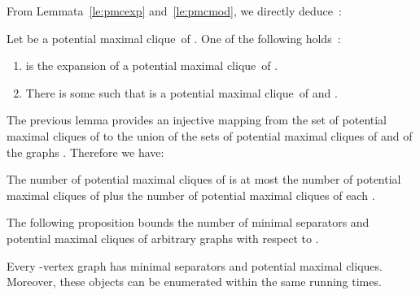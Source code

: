 \documentclass{llncs}
\newcommand{\pmc}{potential maximal clique}
\begin{document}
From Lemmata~\ref{le:pmcexp} and~\ref{le:pmcmod}, we directly deduce~:
\begin{lemma}\label{le:pmcmw}
Let  be a \pmc\ of . One of the following holds~:
\begin{enumerate}
\item  is the expansion of a \pmc\  of . 
\item There is some  such that  is a \pmc\ of  and .
\end{enumerate}
\end{lemma}

The previous lemma provides an injective mapping from the set of \pmc s of  to the union of the sets of \pmc s of  and of the graphs . Therefore we have:
\begin{corollary}\label{co:pmcexp}
The number of \pmc s of  is at most the number of \pmc s of  plus the number of \pmc s of each . 
\end{corollary}

The following proposition bounds the number of minimal separators and \pmc s of arbitrary graphs with respect to .
\begin{proposition}\label{pr:nbsep}\label{pr:nbpmc}
Every -vertex graph has  minimal separators and  \pmc s. Moreover, these objects can be enumerated within the same running times. 
\end{proposition}
\end{document}
